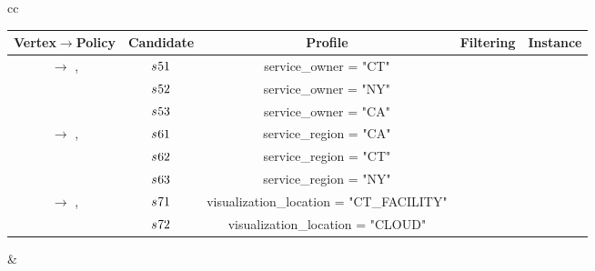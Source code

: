 \begin{example}[\bf \pipelineInstance]
\begin{table*}
{\begin{tabular}[t]{cc}
\begin{tabular}{c|c|c|c|c}
        \textbf{Vertex$\rightarrow$Policy}                   & \textbf{Candidate} & \textbf{Profile}                         & \textbf{Filtering} & \textbf{Instance} \\\hline
        \multirow{ 3}{*}{\vi{5}  $\rightarrow$ \p{1},\p{2} } & $s_{}{51}$           & service\_owner =    "CT"                 & \cmark             & \cmark            \\
                                                              & $s_{}{52}$           & service\_owner =    "NY"                 & \cmark             & \xmark            \\
                                                              & $s_{}{53}$           & service\_owner =    "CA"                 & \xmark             & \xmark            \\
        \hline
        \multirow{ 3}{*}{\vi{6}  $\rightarrow$ \p{3},\p{4} } & $s_{}{61}$           & service\_region =    "CA"                & \xmark             & \xmark            \\
                                                              & $s_{}{62}$           & service\_region =    "CT"                & \cmark             & \cmark            \\
                                                              & $s_{}{63}$           & service\_region =    "NY"                & \cmark             & \xmark            \\
        \hline
        \multirow{ 3}{*}{\vi{7}  $\rightarrow$ \p{5},\p{6} } & $s_{}{71}$           & visualization\_location = "CT\_FACILITY" & \cmark             & \cmark            \\
                                                              & $s_{}{72}$           & visualization\_location = "CLOUD"        & \cmark             & \xmark            \\
      \end{tabular}
                                  &

      \begin{tabular}{c|c}\label{tab:instance_example_maxquality}


\end{tabular}
\end{tabular}}
\end{table*}
\end{example}
